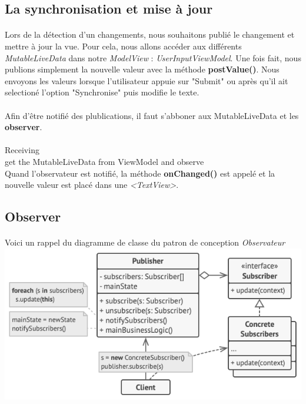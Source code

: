 \documentclass[a4paper]{article}
\begin{document}
\begin{multicols}{2}
            \subsection{La synchronisation et mise à jour}
                \paragraph{}
                    Lors de la détection d'un changements, nous souhaitons publié le changement et mettre à jour la vue. Pour cela, nous allons accéder aux différents \emph{MutableLiveData} dans notre \emph{ModelView} : \emph{UserInputViewModel}. Une fois fait, nous publions simplement la nouvelle valeur avec la méthode \textbf{postValue()}. Nous envoyons les valeurs lorsque l'utilisateur appuie sur "Submit" ou après qu'il ait selectioné l'option "Synchronise" puis modifie le texte.
                \paragraph{}
                    Afin d'être notifié des plublications, il faut s'abboner aux MutableLiveData et les \textbf{observer}.
                \paragraph{}
                    Receiving
                    \\
                    get the MutableLiveData from ViewModel and observe
                    \\
                    Quand l'observateur est notifié, la méthode \textbf{onChanged()} est appelé et la nouvelle valeur est placé dans une \emph{<TextView>}.
            \subsection{Observer}
                \paragraph{}
                    Voici un rappel du diagramme de classe du patron de conception \emph{Observateur} 
                    \includegraphics[width=.49\textwidth]{observer}

\end{multicols}
\end{document}
